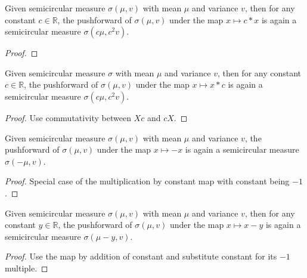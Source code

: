 \begin{lemma}
  \label{lem:semicircleReal_map_const_mul}
  \leanok
    Given semicircular measure $\sigma(\mu, v)$ with mean $\mu$ and variance $v$, then for any constant $c \in \mathbb{R}$, the pushforward
  of $\sigma(\mu, v)$ under the map $x \mapsto c * x$ is again a semicircular measure $\sigma(c\mu, c^2v)$.
  \begin{proof}
  \end{proof}
\end{lemma}



\begin{lemma}
  \label{lem:semicircleReal_map_mul_const}
  \leanok
   Given semicircular measure $\sigma$ with mean $\mu$ and variance $v$, then for any constant $c \in \mathbb{R}$, the pushforward
  of $\sigma(\mu, v)$ under the map $x \mapsto x * c$ is again a semicircular measure $\sigma(c\mu, c^2v)$.
  \begin{proof}
    Use commutativity between $Xc$ and $cX$.
  \end{proof}
\end{lemma}



\begin{lemma}
  \label{lem:semicircleReal_map_neg}
  \leanok
  Given semicircular measure $\sigma(\mu, v)$ with mean $\mu$ and variance $v$, the pushforward
  of $\sigma(\mu, v)$ under the map $x \mapsto -x$ is again a semicircular measure $\sigma(- \mu, v)$.
  \begin{proof}
     Special case of the multiplication by constant map with constant being $-1$.
  \end{proof}
\end{lemma}



\begin{lemma}
  \label{lem:semicircleReal_map_sub_const}
  \leanok
  Given semicircular measure $\sigma(\mu, v)$ with mean $\mu$ and variance $v$, then for any constant $y \in \mathbb{R}$, the pushforward
  of $\sigma(\mu, v)$ under the map $x \mapsto x - y$ is again a semicircular measure $\sigma( \mu - y, v)$.
  \begin{proof}
   Use the map by addition of constant and substitute constant for its $-1$ multiple.
  \end{proof}
\end{lemma}


